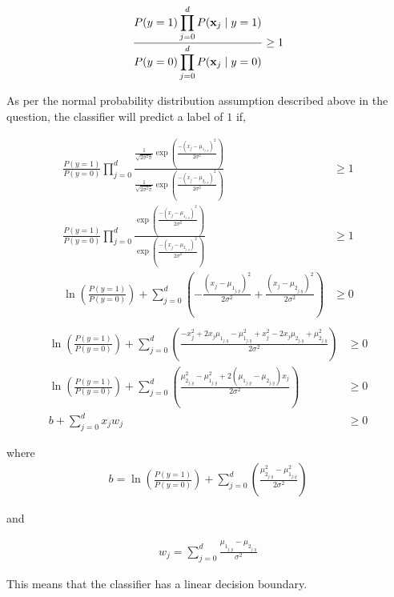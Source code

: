 \begin{equation*}
\begin{aligned}
\frac{P(y=1) \displaystyle \prod_{j=0}^{d} P({\bf x}_j  \mid y=1) }{ P(y=0) \displaystyle \prod_{j=0}^{d} P({\bf x}_j \mid y=0)} \geq 1
\end{aligned}
\end{equation*}

As per the normal probability distribution assumption described above in the question, the classifier will predict a label of $1$ if,

\begin{equation*}
\begin{aligned}
\frac{P(y=1)}{P(y=0)} \displaystyle \prod_{j=0}^{d}  \frac{ \frac{1}{\sqrt{2 \sigma^2 \pi}} \exp\left(\frac{-\left(x_j - \mu_{1_{j,y}}\right)^2}{2\sigma^2}\right)}{   \frac{1}{\sqrt{2 \sigma^2 \pi}} \exp\left(\frac{-\left(x_j - \mu_{2_{j,y}}\right)^2}{2\sigma^2}\right)} &\geq 1\\
\frac{P(y=1)}{P(y=0)} \displaystyle \prod_{j=0}^{d} \frac{\exp\left(\frac{-\left(x_j - \mu_{1_{j,y}}\right)^2}{2\sigma^2}\right)}{\exp\left(\frac{-\left(x_j - \mu_{2_{j,y}}\right)^2}{2\sigma^2}\right)} &\geq 1\\
\ln \left( \frac{P(y=1)}{P(y=0)}\right) + \displaystyle \sum_{j=0}^{d} \left(  - \frac{\left( x_j - \mu_{1_{j,y}} \right)^2}{2\sigma^2} + \frac{\left( x_j - \mu_{2_{j,y}} \right)^2}{2\sigma^2} \right) &\geq 0\\
\end{aligned}
\end{equation*}
\begin{equation*}
\begin{aligned}
\ln \left( \frac{P(y=1)}{P(y=0)}\right) + \displaystyle \sum_{j=0}^{d} \left(  \frac{-x_j^2 + 2x_j\mu_{1_{j,y}} - \mu_{1_{j,y}}^2 + x_j^2 - 2x_j\mu_{2_{j,y}} + \mu_{2_{j,y}}^2 }{2\sigma^2} \right) &\geq 0\\
\ln \left( \frac{P(y=1)}{P(y=0)}\right) + \displaystyle \sum_{j=0}^{d} \left(  \frac{\mu_{2_{j,y}}^2  - \mu_{1_{j,y}}^2 + 2(\mu_{1_{j,y}} - \mu_{2_{j,y}})x_j  }{2\sigma^2} \right) &\geq 0\\
b + \displaystyle \sum_{j=0}^{d} x_j w_j &\geq 0
\end{aligned}
\end{equation*}

where 
\begin{equation*}
\begin{aligned}
b=\ln \left( \frac{P(y=1)}{P(y=0)}\right) + \displaystyle \sum_{j=0}^{d} \left(  \frac{\mu_{2_{j,y}}^2  - \mu_{1_{j,y}}^2 }{2\sigma^2} \right) 
\end{aligned}
\end{equation*}

and

\begin{equation*}
\begin{aligned}
w_j = \displaystyle \sum_{j=0}^{d} \frac{\mu_{1_{j,y}} - \mu_{2_{j,y}}}{\sigma^2}
\end{aligned}
\end{equation*}

This means that the classifier has a linear decision boundary.
